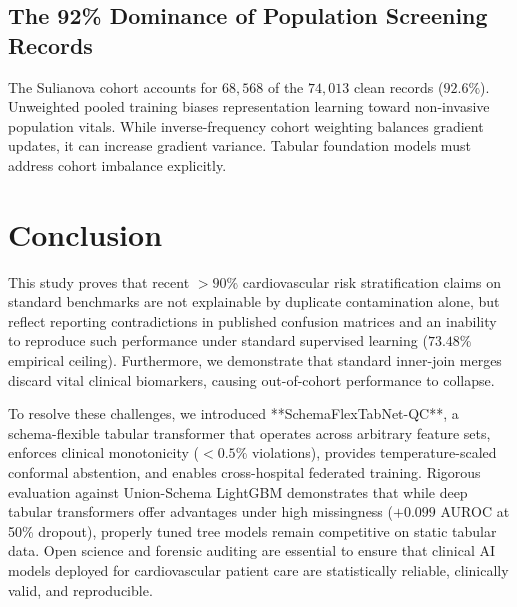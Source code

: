 \documentclass[journal]{IEEEtran}
\begin{document}
\subsection{The 92\% Dominance of Population Screening Records}
The Sulianova cohort accounts for $68,568$ of the $74,013$ clean records ($92.6\%$). Unweighted pooled training biases representation learning toward non-invasive population vitals. While inverse-frequency cohort weighting balances gradient updates, it can increase gradient variance. Tabular foundation models must address cohort imbalance explicitly.

\section{Conclusion}
This study proves that recent $>90\%$ cardiovascular risk stratification claims on standard benchmarks are not explainable by duplicate contamination alone, but reflect reporting contradictions in published confusion matrices and an inability to reproduce such performance under standard supervised learning ($73.48\%$ empirical ceiling). Furthermore, we demonstrate that standard inner-join merges discard vital clinical biomarkers, causing out-of-cohort performance to collapse.

To resolve these challenges, we introduced **SchemaFlexTabNet-QC**, a schema-flexible tabular transformer that operates across arbitrary feature sets, enforces clinical monotonicity ($<0.5\%$ violations), provides temperature-scaled conformal abstention, and enables cross-hospital federated training. Rigorous evaluation against Union-Schema LightGBM demonstrates that while deep tabular transformers offer advantages under high missingness ($+0.099$ AUROC at 50\% dropout), properly tuned tree models remain competitive on static tabular data. Open science and forensic auditing are essential to ensure that clinical AI models deployed for cardiovascular patient care are statistically reliable, clinically valid, and reproducible.
\end{document}

